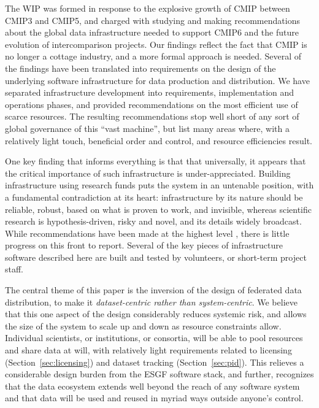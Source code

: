 \documentclass[gmd,manuscript]{copernicus}
\begin{document}
\label{sec:summary}

The WIP was formed in response to the explosive growth of CMIP between
CMIP3 and CMIP5, and charged with studying and making recommendations
about the global data infrastructure needed to support CMIP6 and the
future evolution of intercomparison projects. Our findings reflect the
fact that CMIP is no longer a cottage industry, and a more formal
approach is needed. Several of the findings have been translated into
requirements on the design of the underlying software infrastructure
for data production and distribution. We have separated infrastructure
development into requirements, implementation and operations phases,
and provided recommendations on the most efficient use of scarce
resources. The resulting recommendations stop well short of any sort
of global governance of this ``vast machine'', but list many areas
where, with a relatively light touch, beneficial order and control,
and resource efficiencies result.

One key finding that informs everything is that that universally, it
appears that the critical importance of such infrastructure is
under-appreciated. Building infrastructure using research funds puts
the system in an untenable position, with a fundamental contradiction
at its heart: infrastructure by its nature should be reliable, robust,
based on what is proven to work, and invisible, whereas scientific
research is hypothesis-driven, risky and novel, and its details widely
broadcast. While recommendations have been made at the highest level
\citep[e.g.,][]{ref:nasem2012}, there is little progress on this front
to report. Several of the key pieces of infrastructure software
described here are built and tested by volunteers, or short-term
project staff.

The central theme of this paper is the inversion of the design of
federated data distribution, to make it \emph{dataset-centric rather
  than system-centric}. We believe that this one aspect of the design
considerably reduces systemic risk, and allows the size of the system
to scale up and down as resource constraints allow. Individual
scientists, or institutions, or consortia, will be able to pool
resources and share data at will, with relatively light requirements
related to licensing (Section~\ref{sec:licensing}) and dataset
tracking (Section~\ref{sec:pid}). This relieves a considerable design
burden from the ESGF software stack, and further, recognizes that the
data ecosystem extends well beyond the reach of any software system
and that data will be used and reused in myriad ways outside anyone's
control.
\end{document}
